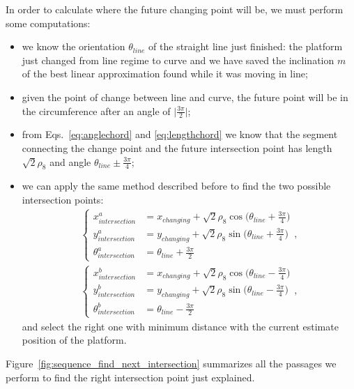 \begin{itemize}
In order to calculate where the future changing point will be, we must perform some computations:
\begin{itemize}
\item we know the orientation $\theta_{line}$ of the straight line just finished: the platform just changed from line regime to curve and we have saved the inclination $m$ of the best linear approximation found while it was moving in line;
\item given the point of change between line and curve, the future point will be in the circumference after an angle of $\big | \frac{3\pi}{2} \big |$;
\item from Eqs.~\eqref{eq:anglechord} and \eqref{eq:lengthchord} we know that the segment connecting the change point and the future intersection point has length $\sqrt{2}\rho_8$ and angle $\theta_{line} \pm \frac{3\pi}{4} $;
\item we can apply the same method described before to find the two possible intersection points:
\begin{align}
\begin{cases}
x_{intersection}^a &= x_{changing} + \sqrt{2}\rho_8\cos{\Big(\theta_{line} + \frac{3\pi}{4}\Big) }\\[5pt]
y_{intersection}^a &= y_{changing} + \sqrt{2}\rho_8\sin{\Big(\theta_{line} + \frac{3\pi}{4}\Big) }\\[5pt]
\theta_{intersection}^a &=  \theta_{line} + \frac{3\pi}{2}
\end{cases},
\end{align}
\begin{align}
\begin{cases}
x_{intersection}^b &= x_{changing} + \sqrt{2}\rho_8\cos{\Big(\theta_{line} - \frac{3\pi}{4}\Big) }\\[5pt]
y_{intersection}^b &= y_{changing} + \sqrt{2}\rho_8\sin{\Big(\theta_{line} - \frac{3\pi}{4}\Big) }\\[5pt]
\theta_{intersection}^b &=  \theta_{line} - \frac{3\pi}{2}
\end{cases},
\end{align}
and select the right one with minimum distance with the current estimate position of the platform.
\end{itemize}


Figure~\ref{fig:sequence_find_next_intersection} summarizes all the passages we perform to find the right intersection point just explained.


\end{itemize}
